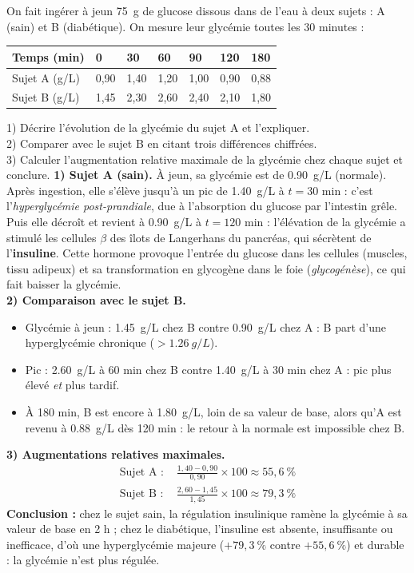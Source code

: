 \documentclass[11pt]{article}
\begin{document}
\begin{exoresolu}
On fait ingérer à jeun \SI{75}{g} de glucose dissous dans de l'eau à deux sujets : A (sain) et B (diabétique). On mesure leur glycémie toutes les 30 minutes :
\begin{center}
\begin{tabularx}{\linewidth}{|l|X|X|X|X|X|X|}\hline
\rowcolor{popblueL} Temps (min) & 0 & 30 & 60 & 90 & 120 & 180 \\ \hline
Sujet A (g/L) & 0,90 & 1,40 & 1,20 & 1,00 & 0,90 & 0,88 \\ \hline
Sujet B (g/L) & 1,45 & 2,30 & 2,60 & 2,40 & 2,10 & 1,80 \\ \hline
\end{tabularx}
\end{center}
1) Décrire l'évolution de la glycémie du sujet A et l'expliquer.\\
2) Comparer avec le sujet B en citant trois différences chiffrées.\\
3) Calculer l'augmentation relative maximale de la glycémie chez chaque sujet et conclure.
\tcblower
\textbf{1) Sujet A (sain).} À jeun, sa glycémie est de \SI{0,90}{g/L} (normale). Après ingestion, elle s'élève jusqu'à un pic de \SI{1,40}{g/L} à $t = 30$ min : c'est l'\emph{hyperglycémie post-prandiale}, due à l'absorption du glucose par l'intestin grêle. Puis elle décroît et revient à \SI{0,90}{g/L} à $t = 120$ min : l'élévation de la glycémie a stimulé les cellules $\beta$ des îlots de Langerhans du pancréas, qui sécrètent de l'\textbf{insuline}. Cette hormone provoque l'entrée du glucose dans les cellules (muscles, tissu adipeux) et sa transformation en glycogène dans le foie (\emph{glycogénèse}), ce qui fait baisser la glycémie.\\[2mm]
\textbf{2) Comparaison avec le sujet B.}
\begin{itemize}
\item Glycémie à jeun : \SI{1,45}{g/L} chez B contre \SI{0,90}{g/L} chez A : B part d'une hyperglycémie chronique ($> \SI{1,26}{g/L}$).
\item Pic : \SI{2,60}{g/L} à 60 min chez B contre \SI{1,40}{g/L} à 30 min chez A : pic plus élevé \emph{et} plus tardif.
\item À 180 min, B est encore à \SI{1,80}{g/L}, loin de sa valeur de base, alors qu'A est revenu à \SI{0,88}{g/L} dès 120 min : le retour à la normale est impossible chez B.
\end{itemize}
\textbf{3) Augmentations relatives maximales.}
\begin{align*}
\text{Sujet A : } & \frac{1,40 - 0,90}{0,90} \times 100 \approx 55,6\ \% \\
\text{Sujet B : } & \frac{2,60 - 1,45}{1,45} \times 100 \approx 79,3\ \%
\end{align*}
\textbf{Conclusion :} chez le sujet sain, la régulation insulinique ramène la glycémie à sa valeur de base en 2 h ; chez le diabétique, l'insuline est absente, insuffisante ou inefficace, d'où une hyperglycémie majeure ($+79,3\ \%$ contre $+55,6\ \%$) et durable : la glycémie n'est plus régulée.
\end{exoresolu}
\end{document}
